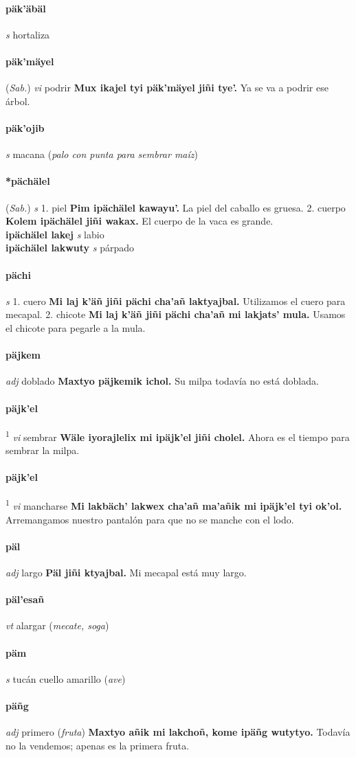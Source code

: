 \documentclass{scrbook}
\newcommand{\entry}[1]{\paragraph{#1}}
\newcommand{\onedefinition}[1]{#1.}
\newcommand{\defsuperscript}[1]{\textsuperscript{1}}
\newcommand{\partofspeech}[1]{\textit{#1}}
\newcommand{\spanishtranslation}[1]{#1}
\newcommand{\clarification}[1]{(\textit{#1})}
\newcommand{\cholexample}[1]{\textbf{#1}}
\newcommand{\exampletranslation}[1]{#1}
\newcommand{\relevantdialect}[1]{(\textit{#1})}
\newcommand{\secondaryentry}[1]{\\\textbf{#1}}
\newcommand{\secondpartofspeech}[1]{\textit{#1}}
\newcommand{\secondtranslation}[1]{#1}
\begin{document}
\begin{multicols}{2}
\entry{päk'äbäl}
\partofspeech{s}
\spanishtranslation{hortaliza}

\entry{päk'mäyel}
\relevantdialect{Sab.}
\partofspeech{vi}
\spanishtranslation{podrir}
\cholexample{Mux ikajel tyi päk'mäyel jiñi tye'.}
\exampletranslation{Ya se va a podrir ese árbol.}

\entry{päk'ojib}
\partofspeech{s}
\spanishtranslation{macana}
\clarification{palo con punta para sembrar maíz}

\entry{*pächälel}
\relevantdialect{Sab.}
\partofspeech{s}
\onedefinition{1}
\spanishtranslation{piel}
\cholexample{Pim ipächälel kawayu'.}
\exampletranslation{La piel del caballo es gruesa.}
\onedefinition{2}
\spanishtranslation{cuerpo}
\cholexample{Kolem ipächälel jiñi wakax.}
\exampletranslation{El cuerpo de la vaca es grande.}
\secondaryentry{ipächälel lakej}
\secondpartofspeech{s}
\secondtranslation{labio}
\secondaryentry{ipächälel lakwuty}
\secondpartofspeech{s}
\secondtranslation{párpado}

\entry{pächi}
\partofspeech{s}
\onedefinition{1}
\spanishtranslation{cuero}
\cholexample{Mi laj k'äñ jiñi pächi cha'añ laktyajbal.}
\exampletranslation{Utilizamos el cuero para mecapal.}
\onedefinition{2}
\spanishtranslation{chicote}
\cholexample{Mi laj k'äñ jiñi pächi cha'añ mi lakjats' mula.}
\exampletranslation{Usamos el chicote para pegarle a la mula.}

\entry{päjkem}
\partofspeech{adj}
\spanishtranslation{doblado}
\cholexample{Maxtyo päjkemik ichol.}
\exampletranslation{Su milpa todavía no está doblada.}

\entry{päjk'el}
\defsuperscript{1}
\partofspeech{vi}
\spanishtranslation{sembrar}
\cholexample{Wäle iyorajlelix mi ipäjk'el jiñi cholel.}
\exampletranslation{Ahora es el tiempo para sembrar la milpa.}

\entry{päjk'el}
\defsuperscript{2}
\partofspeech{vi}
\spanishtranslation{mancharse}
\cholexample{Mi lakbäch' lakwex cha'añ ma'añik mi ipäjk'el tyi ok'ol.}
\exampletranslation{Arremangamos nuestro pantalón para que no se manche con el lodo.}

\entry{päl}
\partofspeech{adj}
\spanishtranslation{largo}
\cholexample{Päl jiñi ktyajbal.}
\exampletranslation{Mi mecapal está muy largo.}

\entry{päl'esañ}
\partofspeech{vt}
\spanishtranslation{alargar}
\clarification{mecate, soga}

\entry{päm}
\partofspeech{s}
\spanishtranslation{tucán cuello amarillo}
\clarification{ave}

\entry{päñg}
\partofspeech{adj}
\spanishtranslation{primero}
\clarification{fruta}
\cholexample{Maxtyo añik mi lakchoñ, kome ipäñg wutytyo.}
\exampletranslation{Todavía no la vendemos; apenas es la primera fruta.}


\end{multicols}
\end{document}

